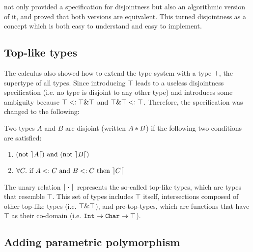 \oldname not only provided a specification for disjointness but also an algorithmic version
of it, and proved that both versions are equivalent.
This turned disjointness as a concept which is both easy to understand and easy to implement. 

\subsection{Top-like types}
The \oldname calculus also showed how to extend the type system with a type $\top$, the supertype 
of all types.
Since introducing $\top$ leads to a useless disjointness specification (i.e. no type is disjoint to
any other type) and introduces some ambiguity because $\top <: \top \& \top$ and
$\top \& \top <: \top$.
Therefore, the specification was changed to the following:

\begin{definition}
  Two types $A$ and $B$ are disjoint
  (written $A * B$) if the following two conditions are satisfied:
\begin{enumerate}
  \item $(\text{not}~\rceil A \lceil)~\text{and}~(\text{not}~\rceil B \lceil) $
  \item $\forall C.~\text{if}~ A <: C~\text{and}~B <: C~\text{then}~\rceil C \lceil$
\end{enumerate}
\end{definition}
The unary relation $\rceil \cdot \lceil$ represents the so-called top-like types, which are types that resemble 
$\top$.
This set of types includes $\top$ itself, intersections composed of other 
top-like types (i.e. $\top \& \top$), and pre-top-types, which are functions that have
$\top$ as their co-domain (i.e. $\texttt{Int} \to \texttt{Char} \to \top$).

\subsection{Adding parametric polymorphism}

